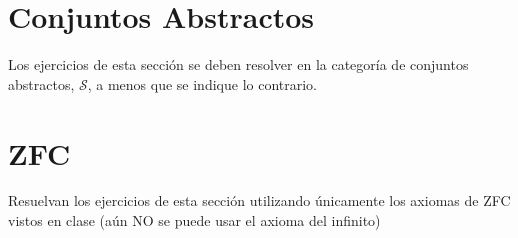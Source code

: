 \documentclass[12pt]{article}
\newcommand{\topos}[1]{\mathscr{#1}}
\begin{document}
\section*{Conjuntos Abstractos}
Los ejercicios de esta sección se deben resolver en la categoría de
conjuntos abstractos, \(\topos{S}\), a menos que se indique lo contrario.



\section*{ZFC}
Resuelvan los ejercicios de esta sección utilizando únicamente los axiomas de ZFC vistos en clase (aún NO se puede usar el axioma del infinito)


\end{document}
